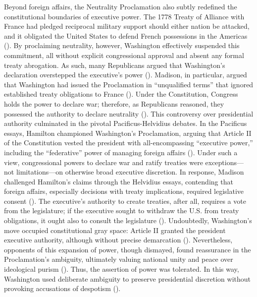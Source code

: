 \documentclass[12pt, a4paper, twoside]{article}
\begin{document}
Beyond foreign affairs, the Neutrality Proclamation also subtly redefined the constitutional boundaries of executive power. The 1778 Treaty of Alliance with France had pledged reciprocal military support should either nation be attacked, and it obligated the United States to defend French possessions in the Americas (\cite[p.\ 11–12]{reinstein2011}). By proclaiming neutrality, however, Washington effectively suspended this commitment, all without explicit congressional approval and absent any formal treaty abrogation. As such, many Republicans argued that Washington’s declaration overstepped the executive’s power (\cite[p.\ 126]{schmitt2000}). Madison, in particular, argued that Washington had issued the Proclamation in “unqualified terms” that ignored established treaty obligations to France (\cite[p.\ 126]{schmitt2000}). Under the Constitution, Congress holds the power to declare war; therefore, as Republicans reasoned, they possessed the authority to declare neutrality (\cites[p.\ 691]{chernow2011}[p.\ 127]{schmitt2000}[pp.\ 329–331]{prakash2001}). This controversy over presidential authority culminated in the pivotal Pacificus-Helvidius debates. In the Pacificus essays, Hamilton championed Washington’s Proclamation, arguing that Article II of the Constitution vested the president with all-encompassing “executive power,” including the “federative” power of managing foreign affairs (\cite[§\textsc{xi}, p.\ 12]{hamilton2007}). Under such a view, congressional powers to declare war and ratify treaties were exceptions—not limitations—on otherwise broad executive discretion. In response, Madison challenged Hamilton’s claims through the Helvidius essays, contending that foreign affairs, especially decisions with treaty implications, required legislative consent (\cite[p.\ 64]{hamilton2007}). The executive’s authority to create treaties, after all, requires a vote from the legislature; if the executive sought to withdraw the U.S. from treaty obligations, it ought also to consult the legislature (\cite[§2, cl. 2]{constitution}). Undoubtedly, Washington’s move occupied constitutional gray space: Article II granted the president executive authority, although without precise demarcation (\cite[pp.\ 445–446]{young2011}). Nevertheless, opponents of this expansion of power, though dismayed, found reassurance in the Proclamation’s ambiguity, ultimately valuing national unity and peace over ideological purism (\cite[p.\ 65, 75]{moats2021}). Thus, the assertion of power was tolerated. In this way, Washington used deliberate ambiguity to preserve presidential discretion without provoking accusations of despotism (\cite[p.\ 68]{moats2021}).
\end{document}

